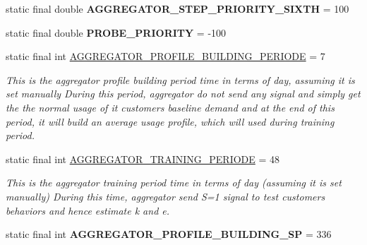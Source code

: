 \begin{DoxyCompactItemize}
\item 
\hypertarget{classuk_1_1ac_1_1dmu_1_1iesd_1_1cascade_1_1base_1_1_consts_a8a01344d20953d14d2ec12e2e73f7cb0}{static final double {\bfseries A\-G\-G\-R\-E\-G\-A\-T\-O\-R\-\_\-\-S\-T\-E\-P\-\_\-\-P\-R\-I\-O\-R\-I\-T\-Y\-\_\-\-S\-I\-X\-T\-H} = 100}\label{classuk_1_1ac_1_1dmu_1_1iesd_1_1cascade_1_1base_1_1_consts_a8a01344d20953d14d2ec12e2e73f7cb0}

\item 
\hypertarget{classuk_1_1ac_1_1dmu_1_1iesd_1_1cascade_1_1base_1_1_consts_a0ab3e0a3357bfe8cce6b89d6946b3908}{static final double {\bfseries P\-R\-O\-B\-E\-\_\-\-P\-R\-I\-O\-R\-I\-T\-Y} = -\/100}\label{classuk_1_1ac_1_1dmu_1_1iesd_1_1cascade_1_1base_1_1_consts_a0ab3e0a3357bfe8cce6b89d6946b3908}

\item 
static final int \hyperlink{classuk_1_1ac_1_1dmu_1_1iesd_1_1cascade_1_1base_1_1_consts_a3d47484df22ee731ef9618cfb2242ea6}{A\-G\-G\-R\-E\-G\-A\-T\-O\-R\-\_\-\-P\-R\-O\-F\-I\-L\-E\-\_\-\-B\-U\-I\-L\-D\-I\-N\-G\-\_\-\-P\-E\-R\-I\-O\-D\-E} = 7
\begin{DoxyCompactList}\small\item\em This is the aggregator profile building period time in terms of day, assuming it is set manually During this period, aggregator do not send any signal and simply get the the normal usage of it customers baseline demand and at the end of this period, it will build an average usage profile, which will used during training period. \end{DoxyCompactList}\item 
static final int \hyperlink{classuk_1_1ac_1_1dmu_1_1iesd_1_1cascade_1_1base_1_1_consts_ae6ae5502793dd1cdc06cdfedfa66b8f8}{A\-G\-G\-R\-E\-G\-A\-T\-O\-R\-\_\-\-T\-R\-A\-I\-N\-I\-N\-G\-\_\-\-P\-E\-R\-I\-O\-D\-E} = 48
\begin{DoxyCompactList}\small\item\em This is the aggregator training period time in terms of day (assuming it is set manually) During this time, aggregator send S=1 signal to test customers behaviors and hence estimate k and e. \end{DoxyCompactList}\item 
\hypertarget{classuk_1_1ac_1_1dmu_1_1iesd_1_1cascade_1_1base_1_1_consts_a52179110bedc210074e2a43a1ac83bf5}{static final int {\bfseries A\-G\-G\-R\-E\-G\-A\-T\-O\-R\-\_\-\-P\-R\-O\-F\-I\-L\-E\-\_\-\-B\-U\-I\-L\-D\-I\-N\-G\-\_\-\-S\-P} = 336}\label{classuk_1_1ac_1_1dmu_1_1iesd_1_1cascade_1_1base_1_1_consts_a52179110bedc210074e2a43a1ac83bf5}


\end{DoxyCompactItemize}
